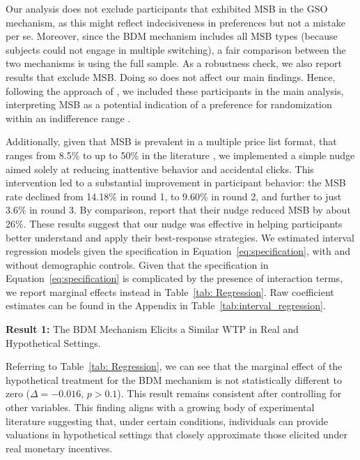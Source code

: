 \documentclass[12pt]{article}
\begin{document}
Our analysis does not exclude participants that exhibited MSB in the GSO mechanism, as this might reflect indecisiveness in preferences but not a mistake per se. Moreover, since the BDM mechanism includes all MSB types (because subjects could not engage in multiple switching), a fair comparison between the two mechanisms is using the full sample. As a robustness check, we also report results that exclude MSB. Doing so does not affect our main findings. Hence, following the approach of \citet{brown2018separated}, we included these participants in the main analysis, interpreting MSB as a potential indication of a preference for randomization within an indifference range \citep{agranov2023stable}. 

Additionally, given that MSB is prevalent in a multiple price list format, that ranges from 8.5\%  to up to 50\% in the literature \citep{yu2021multiple, filippin2016reconsideration}, we implemented a simple nudge aimed solely at reducing inattentive behavior and accidental clicks. This intervention led to a substantial improvement in participant behavior: the MSB rate declined from 14.18\% in round 1, to 9.60\% in round 2, and further to just 3.6\% in round 3. By comparison, \citet{yu2021multiple} report that their nudge reduced MSB by about 26\%. %
These results suggest that our nudge was effective in helping participants better understand and apply their best-response strategies. We estimated interval regression models given the specification in Equation~\ref{eq:specification}, with and without demographic controls. Given that the specification in Equation~\ref{eq:specification} is complicated by the presence of interaction terms, we report marginal effects instead in Table~\ref{tab: Regression}. Raw coefficient estimates can be found in the Appendix in Table~\ref{tab:interval_regression}.



\textbf{Result 1:} The BDM Mechanism Elicits a Similar WTP in Real and Hypothetical Settings. 

Referring to Table~\ref{tab: Regression}, we can see that the marginal effect of the hypothetical treatment for the BDM mechanism is not statistically different to zero (\(\Delta = -0.016\), \(p > 0.1\)). This result remains consistent after controlling for other variables. This finding aligns with a growing body of experimental literature suggesting that, under certain conditions, individuals can provide valuations in hypothetical settings that closely approximate those elicited under real monetary incentives\citep{branas-garza_paid_2023, drichoutis_incentives_2025}. 
 
\end{document}
